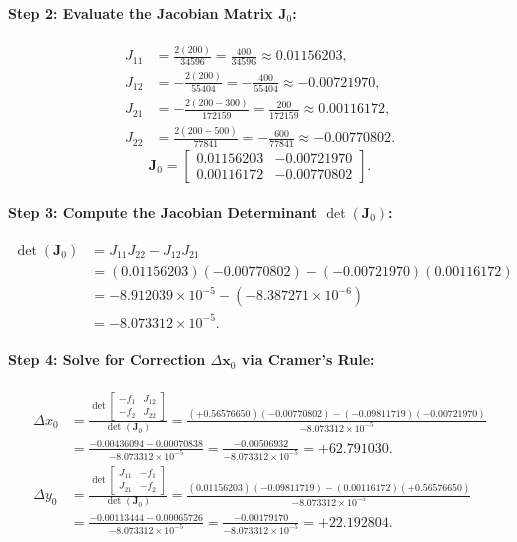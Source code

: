 \documentclass[11pt,a4paper]{article}
\begin{document}
\paragraph{Step 2: Evaluate the Jacobian Matrix $\mathbf{J}_0$:}
\begin{align*}
    J_{11} &= \frac{2(200)}{34596} = \frac{400}{34596} \approx 0.01156203, \\
    J_{12} &= -\frac{2(200)}{55404} = -\frac{400}{55404} \approx -0.00721970, \\
    J_{21} &= -\frac{2(200 - 300)}{172159} = \frac{200}{172159} \approx 0.00116172, \\
    J_{22} &= \frac{2(200 - 500)}{77841} = -\frac{600}{77841} \approx -0.00770802.
\end{align*}
\begin{equation*}
    \mathbf{J}_0 = 
    \begin{bmatrix}
        0.01156203 & -0.00721970 \\
        0.00116172 & -0.00770802
    \end{bmatrix}.
\end{equation*}

\paragraph{Step 3: Compute the Jacobian Determinant $\det(\mathbf{J}_0)$:}
\begin{align*}
    \det(\mathbf{J}_0) &= J_{11} J_{22} - J_{12} J_{21} \\
    &= (0.01156203)(-0.00770802) - (-0.00721970)(0.00116172) \\
    &= -8.912039 \times 10^{-5} - (-8.387271 \times 10^{-6}) \\
    &= -8.073312 \times 10^{-5}.
\end{align*}

\paragraph{Step 4: Solve for Correction $\Delta \mathbf{x}_0$ via Cramer's Rule:}
\begin{align*}
    \Delta x_0 &= \frac{\det \begin{bmatrix} -f_1 & J_{12} \\ -f_2 & J_{22} \end{bmatrix}}{\det(\mathbf{J}_0)} 
    = \frac{(+0.56576650)(-0.00770802) - (-0.09811719)(-0.00721970)}{-8.073312 \times 10^{-5}} \\
    &= \frac{-0.00436094 - 0.00070838}{-8.073312 \times 10^{-5}} = \frac{-0.00506932}{-8.073312 \times 10^{-5}} = +62.791030. \\[1em]
    \Delta y_0 &= \frac{\det \begin{bmatrix} J_{11} & -f_1 \\ J_{21} & -f_2 \end{bmatrix}}{\det(\mathbf{J}_0)} 
    = \frac{(0.01156203)(-0.09811719) - (0.00116172)(+0.56576650)}{-8.073312 \times 10^{-5}} \\
    &= \frac{-0.00113444 - 0.00065726}{-8.073312 \times 10^{-5}} = \frac{-0.00179170}{-8.073312 \times 10^{-5}} = +22.192804.
\end{align*}
\end{document}
